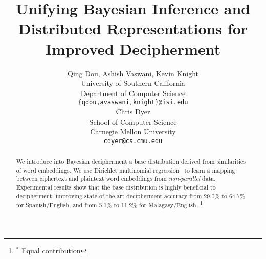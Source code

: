 \documentclass[11pt]{article}
\title{Unifying Bayesian Inference and Distributed Representations for Improved Decipherment}
\author{
Qing Dou\rlap{$^\ast$}, Ashish Vaswani\rlap{$^\ast$}, Kevin Knight \\
University of Southern California \\
Department of Computer Science \\
{\tt \{qdou,avaswani,knight\}@isi.edu}  \\
\AND
Chris Dyer \\
School of Computer Science \\
Carnegie Mellon University \\
{\tt cdyer@cs.cmu.edu} \\
}
\date{}
\begin{document}
\maketitle
\begin{abstract}
We introduce into Bayesian decipherment a base distribution derived from similarities of word embeddings. We use Dirichlet multinomial regression~\cite{mimno2012topic} to learn a mapping between ciphertext and plaintext word embeddings from \emph{non-parallel} data. Experimental results show that the base distribution is highly beneficial to decipherment, improving state-of-the-art decipherment accuracy from 29.0\% to 64.7\% for Spanish/English, and from 5.1\% to 11.2\% for Malagasy/English. %
\let\thefootnote\relax\footnote{$^\ast$ Equal contribution}

 
\end{abstract}




%
%








\end{document}
